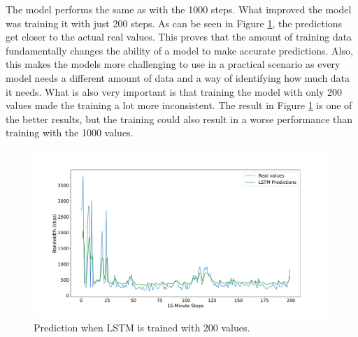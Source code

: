 The model performs the same as with the 1000 steps.
What improved the model was training it with just 200 steps.
As can be seen in Figure \ref{fig:opti}, the predictions get closer to the actual real values.
This proves that the amount of training data fundamentally changes the ability of a model to make accurate predictions.
Also, this makes the models more challenging to use in a practical scenario as every model needs a different amount of data and a way of identifying how much data it needs.
What is also very important is that training the model with only 200 values made the training a lot more inconsistent.
The result in Figure \ref{fig:opti} is one of the better results, but the training could also result in a worse performance than training with the 1000 values.
\begin{figure}
	\centering
	\includegraphics[width=1\linewidth]{Pictures/optimization/LSTMoptimization_1_take2}
	\caption{Prediction when LSTM is trained with 200 values.}
	\label{fig:opti}
\end{figure}

